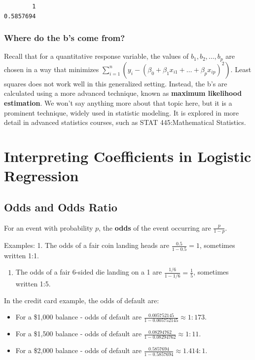 \documentclass[
  letterpaper,
  DIV=11,
  numbers=noendperiod]{scrreprt}
\providecommand{\tightlist}{%
  \setlength{\itemsep}{0pt}\setlength{\parskip}{0pt}}\usepackage{longtable,booktabs,array}
\begin{document}
\begin{verbatim}
        1 
0.5857694 
\end{verbatim}

\subsubsection{Where do the b's come
from?}\label{where-do-the-bs-come-from}

Recall that for a quantitative response variable, the values of
\(b_1, b_2, \ldots, b_p\) are chosen in a way that minimizes
\(\displaystyle\sum_{i=1}^n \left(y_i-(\beta_0+\beta_1x_{i1}+\ldots+\beta_px_{ip})^2\right)\).
Least squares does not work well in this generalized setting. Instead,
the b's are calculated using a more advanced technique, known as
\textbf{maximum likelihood estimation}. We won't say anything more about
that topic here, but it is a prominent technique, widely used in
statistic modeling. It is explored in more detail in advanced statistics
courses, such as STAT 445:Mathematical Statistics.

\section{Interpreting Coefficients in Logistic
Regression}\label{interpreting-coefficients-in-logistic-regression}

\subsection{Odds and Odds Ratio}\label{odds-and-odds-ratio}

For an event with probability \(p\), the \textbf{odds} of the event
occurring are \(\frac{p}{1-p}\).

Examples: 1. The odds of a fair coin landing heads are
\(\frac{0.5}{1-0.5}=1\), sometimes written 1:1.

\begin{enumerate}
\def\labelenumi{\arabic{enumi}.}
\setcounter{enumi}{1}
\tightlist
\item
  The odds of a fair 6-sided die landing on a 1 are
  \(\frac{1/6}{1-1/6}=\frac{1}{5}\), sometimes written 1:5.
\end{enumerate}

In the credit card example, the odds of default are:

\begin{itemize}
\item
  For a \$1,000 balance - odds of default are
  \(\frac{0.005752145}{1-0.005752145} \approx 1:173.\)
\item
  For a \$1,500 balance - odds of default are
  \(\frac{0.08294762 }{1-0.08294762 } \approx 1:11.\)
\item
  For a \$2,000 balance - odds of default are
  \(\frac{0.5857694}{1-0.5857694} \approx 1.414:1.\)
\end{itemize}
\end{document}
